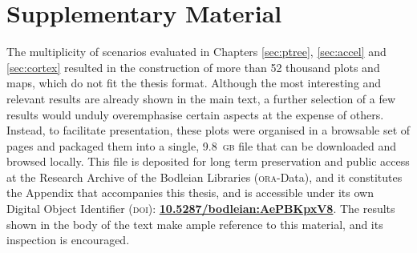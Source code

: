 \chapter{Supplementary Material}
\label{sec:supplmat}
\setstretch{\lspac}

The multiplicity of scenarios evaluated in Chapters \ref{sec:ptree}, \ref{sec:accel} and \ref{sec:cortex} resulted in the construction of more than 52 thousand plots and maps, which do not fit the thesis format. Although the most interesting and relevant results are already shown in the main text, a further selection of a few results would unduly overemphasise certain aspects at the expense of others. Instead, to facilitate presentation, these plots were organised in a browsable set of pages and packaged them into a single, 9.8~\textsc{gb} file that can be downloaded and browsed locally. This file is deposited for long term preservation and public access at the Research Archive of the Bodleian Libraries (\textsc{ora}-Data), and it constitutes the Appendix that accompanies this thesis, and is accessible under its own Digital Object Identifier (\textsc{doi}): \href{https://doi.org/10.5287/bodleian:AePBKpxV8}{\textbf{10.5287/bodleian:AePBKpxV8}}. The results shown in the body of the text make ample reference to this material, and its inspection is encouraged.